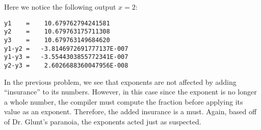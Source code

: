 \documentclass[12pt]{article}
\begin{document}
\bigskip
\noindent Here we notice the following output $x=2$:
\begin{verbatim}
y1    =    10.679762794241581
y2    =    10.679763175711308
y3    =    10.679763149684620
y1-y2 =   -3.8146972691777137E-007
y1-y3 =   -3.5544303855772341E-007
y2-y3 =    2.6026688360047956E-008
\end{verbatim}

\bigskip
In the previous problem, we see that exponents are not affected by adding ``insurance'' to its numbers. However, in this case since the exponent is no longer a whole number, the compiler must compute the fraction before applying its value as an exponent. Therefore, the added insurance is a must. Again, based off of Dr. Glunt's paranoia, the exponents acted just as suspected.
\end{document}
